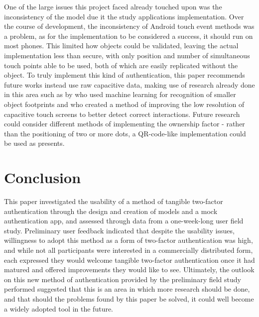 \documentclass{l4proj}
\begin{document}
One of the large issues this project faced already touched upon was the inconsistency of the model due it the study applications implementation. Over the course of development, the inconsistency of Android touch event methods was a problem, as for the implementation to be considered a success, it should run on most phones. This limited how objects could be validated, leaving the actual implementation less than secure, with only position and number of simultaneous touch points able to be used, both of which are easily replicated without the object. To truly implement this kind of authentication, this paper recommends future works instead use raw capacitive data, making use of research already done in this area such as by \cite{schmitz2021itsy} who used machine learning for recognition of smaller object footprints and \cite{mayer2021super} who created a method of improving the low resolution of capacitive touch screens to better detect correct interactions. Future research could consider different methods of implementing the ownership factor - rather than the positioning of two or more dots, a QR-code-like implementation could be used as \cite{yu2011tuic} presents.

\chapter{Conclusion}    

This paper investigated the usability of a method of tangible two-factor authentication through the design and creation of models and a mock authentication app, and assessed through data from a one-week-long user field study. Preliminary user feedback indicated that despite the usability issues, willingness to adopt this method as a form of two-factor authentication was high, and while not all participants were interested in a commercially distributed form, each expressed they would welcome tangible two-factor authentication once it had matured and offered improvements they would like to see. Ultimately, the outlook on this new method of authentication provided by the preliminary field study performed suggested that this is an area in which more research should be done, and that should the problems found by this paper be solved, it could well become a widely adopted tool in the future.


\end{document}
